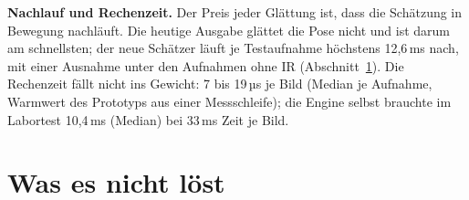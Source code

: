 \documentclass[11pt,a4paper,fleqn]{article}
\begin{document}
\textbf{Nachlauf und Rechenzeit.} Der Preis jeder Glättung ist, dass die Schätzung in Bewegung nachläuft. Die
heutige Ausgabe glättet
die Pose nicht und ist darum am schnellsten; der neue Schätzer läuft je Testaufnahme höchstens 12,6\,ms nach, mit
einer Ausnahme unter den Aufnahmen ohne IR (Abschnitt~\ref{sec:grenzen}). Die Rechenzeit fällt nicht ins Gewicht: 7
bis 19\,µs je Bild (Median je
Aufnahme, Warmwert des Prototyps aus einer Messschleife); die Engine selbst brauchte im Labortest 10,4\,ms (Median) bei 33\,ms Zeit je Bild.

\section{Was es nicht löst}
\label{sec:grenzen}
\end{document}
